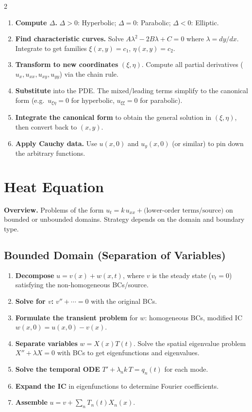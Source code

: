 \documentclass[a4paper,9pt]{article}
\begin{document}
\begin{multicols}{2}
\begin{enumerate}
\item \textbf{Compute $\Delta$.} $\Delta>0$: Hyperbolic; $\Delta=0$: Parabolic; $\Delta<0$: Elliptic.
\item \textbf{Find characteristic curves.} Solve $A\lambda^2 - 2B\lambda + C = 0$ where $\lambda = dy/dx$. Integrate to get families $\xi(x,y)=c_1$, $\eta(x,y)=c_2$.
\item \textbf{Transform to new coordinates} $(\xi,\eta)$. Compute all partial derivatives ($u_x, u_{xx}, u_{xy}, u_{yy}$) via the chain rule.
\item \textbf{Substitute} into the PDE. The mixed/leading terms simplify to the canonical form (e.g.\ $u_{\xi\eta}=0$ for hyperbolic, $u_{\xi\xi}=0$ for parabolic).
\item \textbf{Integrate the canonical form} to obtain the general solution in $(\xi,\eta)$, then convert back to $(x,y)$.
\item \textbf{Apply Cauchy data.} Use $u(x,0)$ and $u_y(x,0)$ (or similar) to pin down the arbitrary functions.
\end{enumerate}

\section{Heat Equation}

\textbf{Overview.} Problems of the form $u_t = k\,u_{xx} + \text{(lower-order terms/source)}$ on bounded or unbounded domains. Strategy depends on the domain and boundary type.

\subsection{Bounded Domain (Separation of Variables)}
\begin{enumerate}
\item \textbf{Decompose} $u = v(x) + w(x,t)$, where $v$ is the steady state ($v_t=0$) satisfying the non-homogeneous BCs/source.
\item \textbf{Solve for $v$:} $v'' + \cdots = 0$ with the original BCs.
\item \textbf{Formulate the transient problem} for $w$: homogeneous BCs, modified IC $w(x,0)=u(x,0)-v(x)$.
\item \textbf{Separate variables} $w = X(x)T(t)$. Solve the spatial eigenvalue problem $X''+\lambda X = 0$ with BCs to get eigenfunctions and eigenvalues.
\item \textbf{Solve the temporal ODE} $T'+\lambda_n k\,T = q_n(t)$ for each mode.
\item \textbf{Expand the IC} in eigenfunctions to determine Fourier coefficients.
\item \textbf{Assemble} $u = v + \sum_n T_n(t)X_n(x)$.
\end{enumerate}


\end{multicols}
\end{document}
